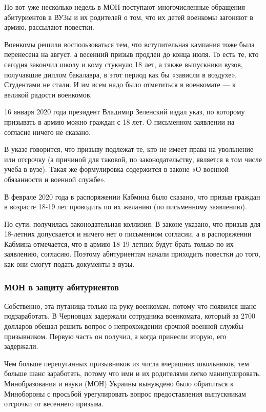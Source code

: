 Но вот уже несколько недель в МОН поступают многочисленные обращения
абитуриентов в ВУЗы и их родителей о том, что их детей военкомы загоняют в
армию, рассылают повестки. 

Военкомы решили воспользоваться тем, что вступительная кампания тоже была
перенесена на август, а весенний призыв продлен до конца июля. То есть те, кто
сегодня закончил школу и кому стукнуло 18 лет, а также выпускники вузов,
получавшие диплом бакалавра, в этот период как бы «зависли в воздухе».
Студентами не стали. И им всем надо было отметиться в военкомате — к великой
радости военкомов. 

16 января 2020 года президент Владимир Зеленский издал указ, по которому
призывать в армию можно граждан с 18 лет. О письменном заявлении на согласие
ничего не сказано. 

В указе говорится, что призыву подлежат те, кто не имеет права на увольнение
или отсрочку (а причиной для таковой, по законодательству, является в том числе
учеба в вузе). Такая же формулировка содержится в законе «О военной обязанности
и военной службе». 

В феврале 2020 года в распоряжении Кабмина было сказано, что призыв граждан в
возрасте 18-19 лет проводить по их желанию (по письменному заявлению). 

По сути, получилась законодательная коллизия. В законе указано, что призыв для
18-летних допускается и ничего нет о письменном согласии, а в распоряжении
Кабмина отмечается, что в армию 18-19-летних будут брать только по их
заявлению, согласию. Поэтому абитуриентам начали приходить повестки до того,
как они смогут подать документы в вузы. 

\subsubsection{МОН в защиту абитуриентов }

Собственно, эта путаница только на руку военкомам, потому что появился шанс
подзаработать. В Черновцах задержали сотрудника военкомата, который за 2700
долларов обещал решить вопрос о непрохождении срочной военной службы
призывником. Первую часть он получил, а когда принесли вторую, его задержали. 

Чем больше перепуганных призывников из числа вчерашних школьников, тем больше
шанс заработать, потому что ими и их родителями легко манипулировать.
Минобразования и науки (МОН) Украины вынуждено было обратиться к Минобороны с
просьбой урегулировать вопрос предоставления выпускникам отсрочки от весеннего
призыва. 

